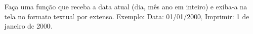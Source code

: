 
\question[10]

Faça uma função que receba a data atual (dia, mês ano em inteiro) e exiba-a na tela no formato textual por extenso. Exemplo: Data: 01/01/2000, Imprimir: 1 de janeiro de 2000.